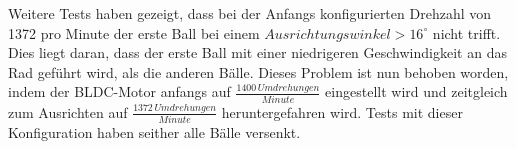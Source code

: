 \noindent
Weitere Tests haben gezeigt, dass bei der Anfangs konfigurierten Drehzahl von 
1372 pro Minute der erste Ball bei einem $Ausrichtungswinkel > 16^\circ$ 
nicht trifft. Dies liegt daran, dass der erste Ball mit einer niedrigeren 
Geschwindigkeit an das Rad geführt wird, als die anderen Bälle. Dieses Problem 
ist nun behoben worden, indem der BLDC-Motor anfangs auf 
$\frac{1400\,Umdrehungen}{Minute}$ eingestellt wird und zeitgleich zum 
Ausrichten auf $\frac{1372\,Umdrehungen}{Minute}$ heruntergefahren wird. 
Tests mit dieser Konfiguration haben seither alle Bälle versenkt.
